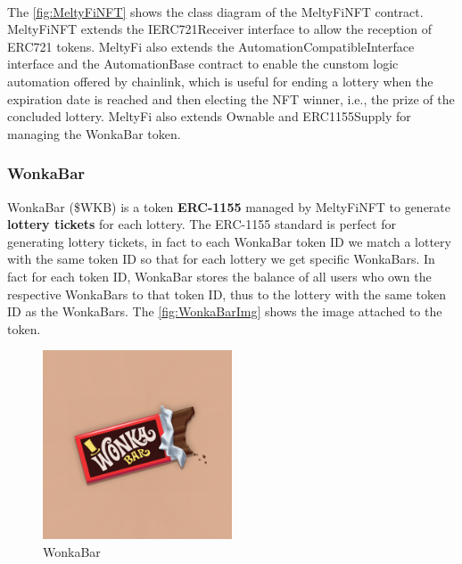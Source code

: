 \\
\indent The \autoref{fig:MeltyFiNFT} shows the class diagram of the MeltyFiNFT contract. MeltyFiNFT extends the IERC721Receiver interface to allow the reception of ERC721 tokens. MeltyFi also extends the AutomationCompatibleInterface interface and the AutomationBase contract to enable the cunstom logic automation offered by chainlink, which is useful for ending a lottery when the expiration date is reached and then electing the NFT winner, i.e., the prize of the concluded lottery. MeltyFi also extends Ownable and ERC1155Supply for managing the WonkaBar token.

\subsubsection{WonkaBar}
WonkaBar (\$WKB) is a token \textbf{ERC-1155} managed by MeltyFiNFT to generate \textbf{lottery tickets} for each lottery. The ERC-1155 standard is perfect for generating lottery tickets, in fact to each WonkaBar token ID we match a lottery with the same token ID so that for each lottery we get specific WonkaBars. In fact for each token ID, WonkaBar stores the balance of all users who own the respective WonkaBars to that token ID, thus to the lottery with the same token ID as the WonkaBars. The \autoref{fig:WonkaBarImg} shows the image attached to the token. 
\begin{figure}[h]
    \centering
    \includegraphics[width=0.5\textwidth]{figures/WonkaBarImg.png}
    \caption{WonkaBar}
    \label{fig:WonkaBarImg}
\end{figure}
